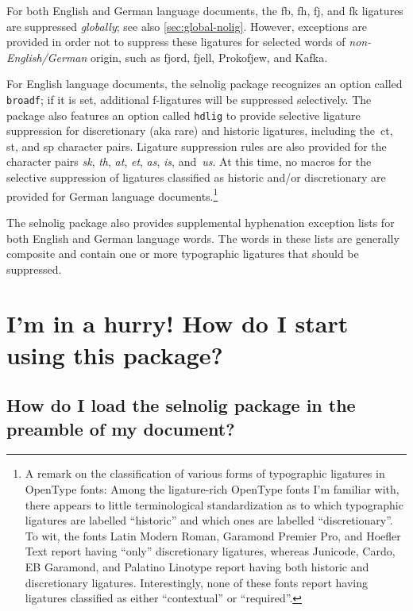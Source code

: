 \documentclass[11pt]{article}
\newcommand{\pkg}[1]{\textsf{#1}}
\newcommand{\opt}[1]{\texttt{#1}}
\begin{document}
For both English and German language documents, the \mbox{fb}, \mbox{fh}, \mbox{fj}, and \mbox{fk} ligatures are suppressed \emph{globally}; see also \cref{sec:global-nolig}. However, exceptions are provided in order not to suppress these ligatures for selected words of \emph{non-English\slash German} origin, such as fjord, fjell, Prokofjew, and Kafka.

For English language documents, the \pkg{selnolig} package recognizes an option called \opt{broadf}; if it is set, additional f-ligatures will be suppressed selectively. The package also features an option called \opt{hdlig} to provide selective ligature suppression for discretionary (aka rare) and historic ligatures, including the~ct, st, and sp character pairs. Ligature suppression rules are also provided for the character pairs {\ebg\emph{sk}}, \emph{th}, \emph{at}, \emph{et}, \emph{as}, \emph{is}, and~\emph{us}. At this time, no macros for the selective suppression of ligatures classified as historic and/or discretionary are provided for German language documents.\footnote{A remark on the classification of various forms of typographic ligatures in OpenType fonts: Among the ligature-rich OpenType fonts I'm familiar with, there appears to little terminological standardization as to which typographic ligatures are labelled \enquote{historic} and which ones are labelled \enquote{discretionary}. To wit, the fonts Latin Modern Roman, Garamond Premier Pro, and Hoefler Text report having \enquote{only} discretionary ligatures, whereas Junicode, Cardo, EB Garamond, and Palatino Linotype report having both historic and discretionary ligatures. Interestingly, none of these fonts report having ligatures classified as either \enquote{contextual} or \enquote{required}. }

The \pkg{selnolig} package also provides supplemental hyphenation exception lists for both English and German language words. The words in these lists are generally composite and contain one or more typographic ligatures that should be suppressed.





\section{I'm in a hurry! How do I start using this package?}

\subsection[How do I load the selnolig package?]{How do I load the \pkg{selnolig} package in the preamble of my document?}
\end{document}

